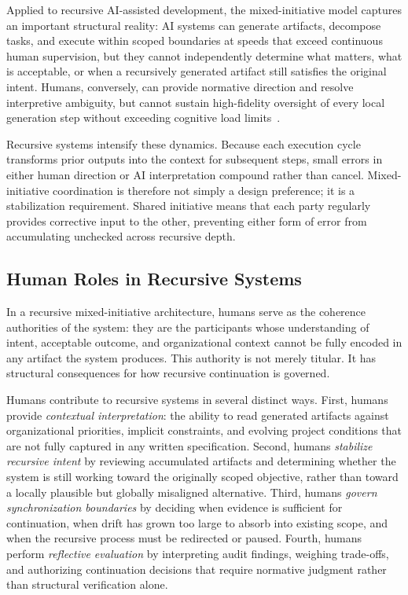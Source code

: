 Applied to recursive AI-assisted development, the mixed-initiative model captures an important structural reality: AI systems can generate artifacts, decompose tasks, and execute within scoped boundaries at speeds that exceed continuous human supervision, but they cannot independently determine what matters, what is acceptable, or when a recursively generated artifact still satisfies the original intent. Humans, conversely, can provide normative direction and resolve interpretive ambiguity, but cannot sustain high-fidelity oversight of every local generation step without exceeding cognitive load limits~\cite{Sweller1988CognitiveLoad,Simon1957ModelsMan}.

Recursive systems intensify these dynamics. Because each execution cycle transforms prior outputs into the context for subsequent steps, small errors in either human direction or AI interpretation compound rather than cancel. Mixed-initiative coordination is therefore not simply a design preference; it is a stabilization requirement. Shared initiative means that each party regularly provides corrective input to the other, preventing either form of error from accumulating unchecked across recursive depth.

\subsection{Human Roles in Recursive Systems}

In a recursive mixed-initiative architecture, humans serve as the coherence authorities of the system: they are the participants whose understanding of intent, acceptable outcome, and organizational context cannot be fully encoded in any artifact the system produces. This authority is not merely titular. It has structural consequences for how recursive continuation is governed.

Humans contribute to recursive systems in several distinct ways. First, humans provide \textit{contextual interpretation}: the ability to read generated artifacts against organizational priorities, implicit constraints, and evolving project conditions that are not fully captured in any written specification. Second, humans \textit{stabilize recursive intent} by reviewing accumulated artifacts and determining whether the system is still working toward the originally scoped objective, rather than toward a locally plausible but globally misaligned alternative. Third, humans \textit{govern synchronization boundaries} by deciding when evidence is sufficient for continuation, when drift has grown too large to absorb into existing scope, and when the recursive process must be redirected or paused. Fourth, humans perform \textit{reflective evaluation} by interpreting audit findings, weighing trade-offs, and authorizing continuation decisions that require normative judgment rather than structural verification alone.

